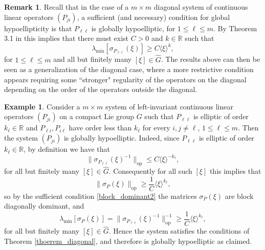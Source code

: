 \documentclass[11pt]{amsart}
\numberwithin{theorem}{section}
\numberwithin{equation}{section}
\theoremstyle{definition}
\newtheorem{example}{Example}
\numberwithin{example}{section}
\theoremstyle{definition}
\newtheorem{obs}{Remark}
\theoremstyle{definition}
\newcommand{\R}{\mathbb{R}}
\begin{document}
\begin{obs}
    Recall that in the case of a $m\times m$ diagonal  system of continuous linear operators $(P_{ji})$, a sufficient (and necessary) condition for global hypoellipticity is that $P_{\ell\ell}$ is globally hypoelliptic, for $1\leq \ell\leq m$. By Theorem 3.1 in \cite{CardKow} this implies that there must exist $C>0$ and $k\in\R$ such that
    \begin{equation*}
         \lambda_{\min}[\sigma_{P_{\ell\ell}}(\xi)]\geq C\langle\xi\rangle^k,
    \end{equation*}
    for $1\leq \ell\leq m$ and all but finitely many $[\xi]\in\widehat{G}$. The results above can then be seen as a generalization of the diagonal case, where a more restrictive condition appears requiring some ``stronger" regularity of the operators on the diagonal depending on the order of the operators outside the diagonal.
\end{obs}




\begin{example}
     Consider a $m\times m$ system of left-invariant continuous linear operators $(P_{ji})$ on a compact Lie group $G$ such that
     $P_{\ell\ell}$ is elliptic of order $k_\ell\in\R$ and $P_{\ell i},P_{i\ell}$ have order less than $k_\ell$ for every $i,j\neq \ell$, $1\leq \ell\leq m$. Then  the system $(P_{ji})$ is globally hypoelliptic. Indeed, since $P_{\ell\ell}$ is elliptic of order $k_\ell\in\R$, by definition we have that 
     \begin{equation*}
         \|\sigma_{P_{\ell\ell}}(\xi)^{-1}\|_{\operatorname{op}}\leq C\langle\xi\rangle^{-k_\ell}, 
     \end{equation*}
     for all but finitely many $[\xi]\in\widehat{G}$. Consequently for all such $[\xi]$ this implies that 
     \begin{equation*}
         \|\sigma_P(\xi)\|_{\operatorname{op}}\geq \frac{1}{C}\langle \xi\rangle^{k_\ell},
     \end{equation*}
     so by the sufficient condition \eqref{block_dominant2} the matrices $\sigma_P(\xi)$ are block diagonally dominant, and 
     \begin{equation*}
         \lambda_{\min}[\sigma_P(\xi)]= \|\sigma_{P_{\ell\ell}}(\xi)^{-1}\|_{\operatorname{op}}^{-1}\geq  \frac{1}{C}\langle \xi\rangle^{k_\ell},
     \end{equation*}
     for all but finitely many $[\xi]\in\widehat{G}$. Hence the system satisfies the conditions of Theorem \ref{thoerem_diagonal}, and therefore is globally hypoelliptic  as claimed.
\end{example}
\end{document}
